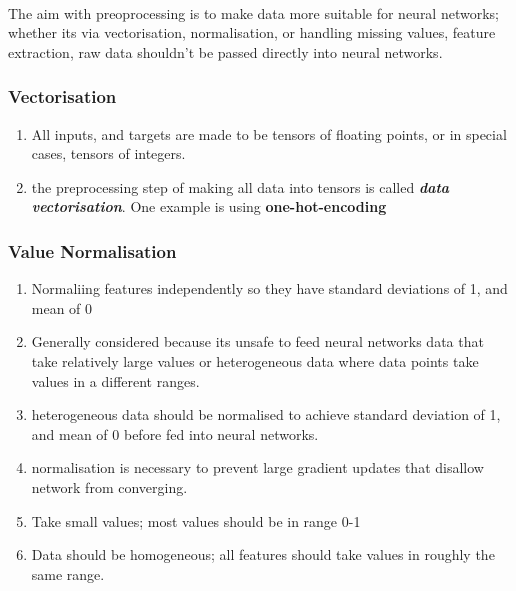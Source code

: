 \documentclass[12pt, a4paper]{article}
\begin{document}
\paragraph*{}
The aim with preoprocessing is to make data more suitable for neural networks;
whether its via vectorisation, normalisation, or handling missing values, feature
extraction, raw data shouldn't be passed directly into neural networks.

\subsubsection{Vectorisation}
\begin{enumerate}
   \item All inputs, and targets are made to be tensors of floating points,
   or in special cases, tensors of integers. 
   \item the preprocessing step of making all data into tensors is called 
   \textbf{\textit{data vectorisation}}. One example is using \textbf{one-hot-encoding}
\end{enumerate}

\subsubsection{Value Normalisation}
\begin{enumerate}
   \item Normaliing features independently so they have standard deviations of 1, and mean of 0
   \item Generally considered because its unsafe to feed neural networks data that take 
   relatively large values or heterogeneous data where data points take values in a different ranges.
   \item heterogeneous data should be normalised to achieve standard deviation of 1, and mean of 0 before
   fed into neural networks.
   \item normalisation is necessary to prevent large gradient updates that disallow network from converging.
   \item  Take small values; most values should be in range 0-1
   \item Data should be homogeneous; all features should take values in roughly the same range.
\end{enumerate}
\end{document}
